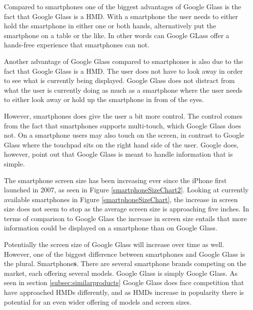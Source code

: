 Compared to smartphones one of the biggest advantages of Google Glass is the fact that Google Glass is a HMD. With a smartphone the user needs to either hold the smartphone in either one or both hands, alternatively put the smartphone on a table or the like. In other words can Google GLass offer a hands-free experience that smartphones can not.

Another advantage of Google Glass compared to smartphones is also due to the fact that Google Glass is a HMD. The user does not have to look away in order to see what is currently being displayed. Google Glass does not distract from what the user is currently doing as much as a smartphone where the user needs to either look away or hold up the smartphone in from of the eyes.

However, smartphones does give the user a bit more control. The control comes from the fact that smartphones supports multi-touch, which Google Glass does not. On a smartphone users may also touch on the screen, in contrast to Google Glass where the touchpad sits on the right hand side of the user. Google does, however, point out that Google Glass is meant to handle information that is simple.\cite{glassDesignPrinciples}

The smartphone screen size has been increasing ever since the iPhone first launched in 2007, as seen in Figure \ref{smartphoneSizeChart2}. Looking at currently available smartphones in Figure \ref{smartphoneSizeChart}, the increase in screen size does not seem to stop as the average screen size is approaching five inches. In terms of comparison to Google Glass the increase in screen size entails that more information could be displayed on a smartphone than on Google Glass.

Potentially the screen size of Google Glass will increase over time as well. However, one of the biggest difference between smartphones and Google Glass is the plural. Smartphone\textbf{s}. There are several smartphone brands competing on the market, each offering several models. Google Glass is simply Google Glass. As seen in section \ref{subsec:similarproducts} Google Glass does face competition that have approached HMDs differently, and as HMDs increase in popularity there is potential for an even wider offering of models and screen sizes.

